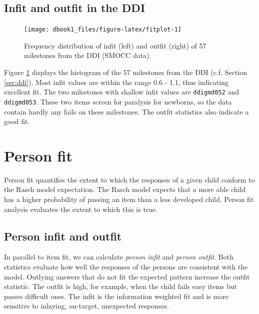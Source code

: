 \documentclass[
]{book}
\begin{document}
\hypertarget{sec:fitddi}{%
\subsection{Infit and outfit in the DDI}\label{sec:fitddi}}

\begin{figure}

{\centering \texttt{[image: dbook1\_files/figure-latex/fitplot-1]} 

}

\caption{Frequency distribution of infit (left) and outfit (right) of 57 milestones from the DDI (SMOCC data).}\label{fig:fitplot}
\end{figure}



Figure \ref{fig:fitplot} displays the histogram of the 57 milestones from the DDI (c.f. Section \ref{sec:ddi}). Most infit values are within the range 0.6 - 1.1, thus indicating excellent fit. The two milestones with shallow infit values are \texttt{ddigmd052} and \texttt{ddigmd053}. These two items screen for paralysis for newborns, so the data contain hardly any fails on these milestones. The outfit statistics also indicate a good fit.

\hypertarget{sec:personfit}{%
\section{Person fit}\label{sec:personfit}}

Person fit quantifies the extent to which the responses of a given child conform to the Rasch model expectation. The Rasch model expects that a more able child has a higher probability of passing an item than a less developed child. Person fit analysis evaluates the extent to which this is true.

\hypertarget{person-infit-and-outfit}{%
\subsection{Person infit and outfit}\label{person-infit-and-outfit}}

In parallel to item fit, we can calculate \emph{person infit} and \emph{person outfit}. Both statistics evaluate how well the responses of the persons are consistent with the model. Outlying answers that do not fit the expected pattern increase the outfit statistic. The outfit is high, for example, when the child fails easy items but passes difficult ones. The infit is the information weighted fit and is more sensitive to inlaying, on-target, unexpected responses.
\end{document}
